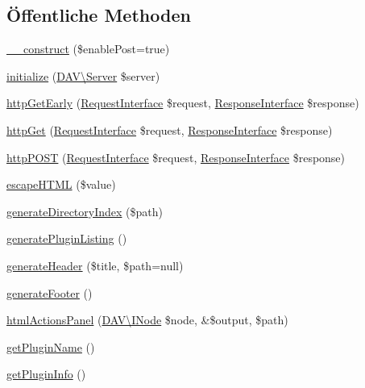 \subsection*{Öffentliche Methoden}
\begin{DoxyCompactItemize}
\item 
\mbox{\hyperlink{class_sabre_1_1_d_a_v_1_1_browser_1_1_plugin_a9690b32ff1c49845700ae232457d40d7}{\+\_\+\+\_\+construct}} (\$enable\+Post=true)
\item 
\mbox{\hyperlink{class_sabre_1_1_d_a_v_1_1_browser_1_1_plugin_a8101548c552a8574dc951318c3badf7b}{initialize}} (\mbox{\hyperlink{class_sabre_1_1_d_a_v_1_1_server}{D\+A\+V\textbackslash{}\+Server}} \$server)
\item 
\mbox{\hyperlink{class_sabre_1_1_d_a_v_1_1_browser_1_1_plugin_a2f0fe9e7294e76b3a28af573bf6bc241}{http\+Get\+Early}} (\mbox{\hyperlink{interface_sabre_1_1_h_t_t_p_1_1_request_interface}{Request\+Interface}} \$request, \mbox{\hyperlink{interface_sabre_1_1_h_t_t_p_1_1_response_interface}{Response\+Interface}} \$response)
\item 
\mbox{\hyperlink{class_sabre_1_1_d_a_v_1_1_browser_1_1_plugin_a321431e8ff5e3e7695757ba2fad7fc0c}{http\+Get}} (\mbox{\hyperlink{interface_sabre_1_1_h_t_t_p_1_1_request_interface}{Request\+Interface}} \$request, \mbox{\hyperlink{interface_sabre_1_1_h_t_t_p_1_1_response_interface}{Response\+Interface}} \$response)
\item 
\mbox{\hyperlink{class_sabre_1_1_d_a_v_1_1_browser_1_1_plugin_aa0c3ca1c6b4558ed4b94e9f20b8941d5}{http\+P\+O\+ST}} (\mbox{\hyperlink{interface_sabre_1_1_h_t_t_p_1_1_request_interface}{Request\+Interface}} \$request, \mbox{\hyperlink{interface_sabre_1_1_h_t_t_p_1_1_response_interface}{Response\+Interface}} \$response)
\item 
\mbox{\hyperlink{class_sabre_1_1_d_a_v_1_1_browser_1_1_plugin_a1265a65231318ee53a9521848e3ae2b5}{escape\+H\+T\+ML}} (\$value)
\item 
\mbox{\hyperlink{class_sabre_1_1_d_a_v_1_1_browser_1_1_plugin_ab1554e3e3d33a3856ca2854d600d0983}{generate\+Directory\+Index}} (\$path)
\item 
\mbox{\hyperlink{class_sabre_1_1_d_a_v_1_1_browser_1_1_plugin_aaf1b2e8a15cc06e44dac590b2008d142}{generate\+Plugin\+Listing}} ()
\item 
\mbox{\hyperlink{class_sabre_1_1_d_a_v_1_1_browser_1_1_plugin_a79e35f5de30bba3e885cee275960f4f1}{generate\+Header}} (\$title, \$path=null)
\item 
\mbox{\hyperlink{class_sabre_1_1_d_a_v_1_1_browser_1_1_plugin_a235b4c30e3784049ad9bb90c9a743472}{generate\+Footer}} ()
\item 
\mbox{\hyperlink{class_sabre_1_1_d_a_v_1_1_browser_1_1_plugin_aa1b1b31fea31df4236783c6bdc4dcac1}{html\+Actions\+Panel}} (\mbox{\hyperlink{interface_sabre_1_1_d_a_v_1_1_i_node}{D\+A\+V\textbackslash{}\+I\+Node}} \$node, \&\$output, \$path)
\item 
\mbox{\hyperlink{class_sabre_1_1_d_a_v_1_1_browser_1_1_plugin_a98a7935b3b6eefe6b47283ba0a1a781b}{get\+Plugin\+Name}} ()
\item 
\mbox{\hyperlink{class_sabre_1_1_d_a_v_1_1_browser_1_1_plugin_a2aa0b3792cfafdf8a575464fd06a946a}{get\+Plugin\+Info}} ()
\end{DoxyCompactItemize}

